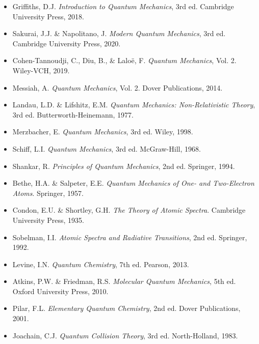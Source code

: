 \documentclass[a4paper, 11pt]{article}
\begin{document}
\begin{itemize}
\item Griffiths, D.J. \textit{Introduction to Quantum Mechanics}, 3rd ed. Cambridge University Press, 2018.
\item Sakurai, J.J. \& Napolitano, J. \textit{Modern Quantum Mechanics}, 3rd ed. Cambridge University Press, 2020.
\item Cohen-Tannoudji, C., Diu, B., \& Laloë, F. \textit{Quantum Mechanics}, Vol. 2. Wiley-VCH, 2019.
\item Messiah, A. \textit{Quantum Mechanics}, Vol. 2. Dover Publications, 2014.
\item Landau, L.D. \& Lifshitz, E.M. \textit{Quantum Mechanics: Non-Relativistic Theory}, 3rd ed. Butterworth-Heinemann, 1977.
\item Merzbacher, E. \textit{Quantum Mechanics}, 3rd ed. Wiley, 1998.
\item Schiff, L.I. \textit{Quantum Mechanics}, 3rd ed. McGraw-Hill, 1968.
\item Shankar, R. \textit{Principles of Quantum Mechanics}, 2nd ed. Springer, 1994.
\item Bethe, H.A. \& Salpeter, E.E. \textit{Quantum Mechanics of One- and Two-Electron Atoms}. Springer, 1957.
\item Condon, E.U. \& Shortley, G.H. \textit{The Theory of Atomic Spectra}. Cambridge University Press, 1935.
\item Sobelman, I.I. \textit{Atomic Spectra and Radiative Transitions}, 2nd ed. Springer, 1992.
\item Levine, I.N. \textit{Quantum Chemistry}, 7th ed. Pearson, 2013.
\item Atkins, P.W. \& Friedman, R.S. \textit{Molecular Quantum Mechanics}, 5th ed. Oxford University Press, 2010.
\item Pilar, F.L. \textit{Elementary Quantum Chemistry}, 2nd ed. Dover Publications, 2001.
\item Joachain, C.J. \textit{Quantum Collision Theory}, 3rd ed. North-Holland, 1983.
\end{itemize}
\end{document}
